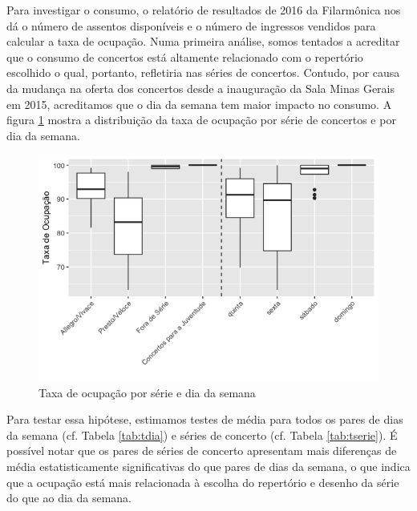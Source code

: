\documentclass[a4paper, 12pt, openright, oneside, german, french, english, brazil]{abntex2}
\begin{document}
	Para investigar o consumo, o relatório de resultados de 2016 da Filarmônica nos dá o número de assentos disponíveis e o número de ingressos vendidos para calcular a taxa de ocupação. Numa primeira análise, somos tentados a acreditar que o consumo de concertos está altamente relacionado com o repertório escolhido o qual, portanto, refletiria nas séries de concertos. Contudo, por causa da mudança na oferta dos concertos desde a inauguração da Sala Minas Gerais em 2015, acreditamos que o dia da semana tem maior impacto no consumo. A figura \ref{fig:txocup} mostra a distribuição da taxa de ocupação por série de concertos e por dia da semana.

        \begin{figure}[!ht]
          \centering
          \caption{Taxa de ocupação por série e dia da semana}
          \label{fig:txocup}
          \includegraphics[scale=0.6]{taxa_ocup_dia_serie}
        \end{figure}

        Para testar essa hipótese, estimamos testes de média para todos os pares de dias da semana (cf. Tabela \ref{tab:tdia}) e séries de concerto (cf. Tabela \ref{tab:tserie}). É possível notar que os pares de séries de concerto apresentam mais diferenças de média estatisticamente significativas do que pares de dias da semana, o que indica que a ocupação está mais relacionada à escolha do repertório e desenho da série do que ao dia da semana.


\end{document}
